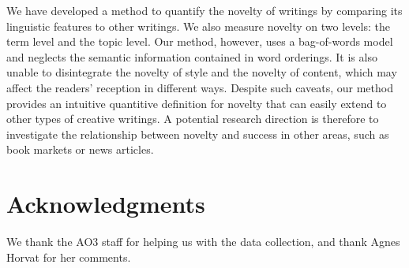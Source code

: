 \documentclass[letterpaper]{article} %
\begin{document}
We have developed a method to quantify the novelty of writings by comparing its linguistic features to other writings. We also measure novelty on two levels: the term level and the topic level. Our method, however, uses a bag-of-words model and neglects the semantic information contained in word orderings. It is also unable to disintegrate the novelty of style and the novelty of content, which may affect the readers' reception in different ways. Despite such caveats, our method provides an intuitive quantitive definition for novelty that can easily extend to other types of creative writings. A potential research direction is therefore to investigate the relationship between novelty and success in other areas, such as book markets or news articles.






\section{ Acknowledgments}
We thank the AO3 staff for helping us with the data collection, and thank Agnes Horvat for her comments.



\end{document}

